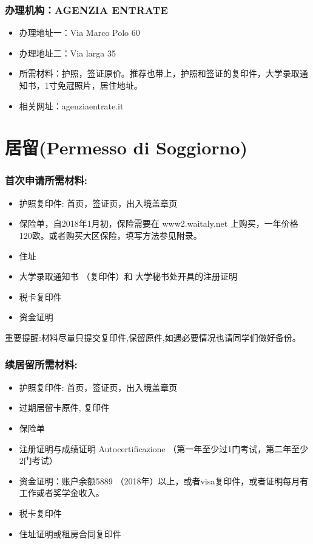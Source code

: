\documentclass[3pt,a5paper,openright,twoside]{book}
\begin{document}
\subsubsection{办理机构：AGENZIA ENTRATE}

\begin{itemize}
\item 办理地址一：Via Marco Polo 60
\item 办理地址二：Via larga 35
\item 所需材料：护照，签证原价。推荐也带上，护照和签证的复印件，大学录取通知书，1寸免冠照片，居住地址。
\item 相关网址：agenziaentrate.it
\end{itemize}


\section{居留(Permesso di Soggiorno)}
\subsubsection{首次申请所需材料:}
\begin{itemize} 
\item 护照复印件: 首页，签证页，出入境盖章页
\item 保险单，自2018年1月初，保险需要在 www2.waitaly.net 上购买，一年价格120欧。或者购买大区保险，填写方法参见附录。
\item 住址
\item 大学录取通知书 （复印件）和 大学秘书处开具的注册证明
\item 税卡复印件
\item 资金证明
\end{itemize}
重要提醒:材料尽量只提交复印件,保留原件,如遇必要情况也请同学们做好备份。

\subsubsection{续居留所需材料:}
\begin{itemize} 
\item 护照复印件: 首页，签证页，出入境盖章页
\item 过期居留卡原件, 复印件
\item 保险单
\item 注册证明与成绩证明 Autocertificazione （第一年至少过1门考试，第二年至少2门考试）
\item 资金证明：账户余额5889 （2018年）以上，或者visa复印件，或者证明每月有工作或者奖学金收入。
\item 税卡复印件
\item 住址证明或租房合同复印件
\end{itemize}
\end{document}
